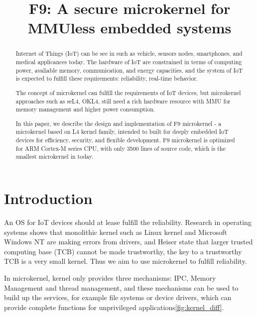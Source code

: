 \documentclass[10pt,preprint,nocopyrightspace]{sigplanconf}
\date{}
\begin{document}
\title{F9: A secure microkernel for MMUless embedded systems}
\maketitle



\begin{abstract}\textsl{}
	
Internet of Things (IoT) can be see in such as vehicle, sensors nodes, smartphones, and medical applicances today. The hardware of IoT are constrained in terms of computing power, avaliable memory, communication, and energy capacities, and the system of IoT is expected to fulfill these requirements: reliability, real-time behavior. 

The concept of microkernel can fulfill the requirements of IoT devices, but microkernel approaches such as seL4, OKL4, still need a rich hardware resource with MMU for memory management and higher power consumption.

In this paper, we describe the design and implementation of F9 microkernel - a microkernel based on L4 kernel family, intended to built for deeply embedded IoT devices for efficiency, security, and flexible development. F9 microkernel is optimized for ARM Cortex-M series CPU, with only 3500 lines of source code, which is the smallest microkernel in today.

\end{abstract}

\section{Introduction}

An OS for IoT devices should at lease fulfill the reliability\cite{baccelli2013riot}. Research in operating systems shows that monolithic kernel such as Linux kernel\cite{chou2001empirical} and Microsoft Windows NT\cite{swift2005improving} are making errors from drivers, and Heiser state that larger trusted computing base (TCB) cannot be made trustworthy, the key to a trustworthy TCB is a very small kernel\cite{heiser2005secure}. Thus we aim to use microkernel to fulfill reliability.

In microkernel, kernel only provides three mechanisms: IPC, Memory Management and thread management, and these mechanisms can be used to build up the services, for example file systems or device drivers, which can provide complete functions for unprivileged applications\ref{fig:kernel_diff}.
\end{document}
